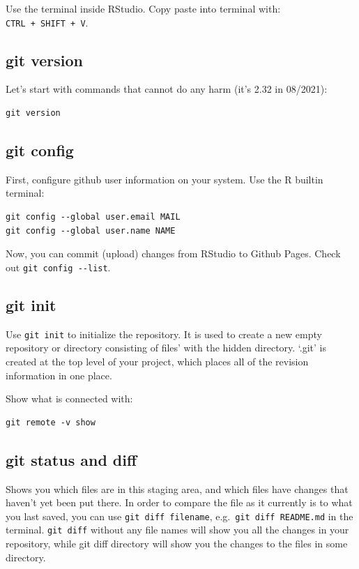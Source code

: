 \documentclass[
]{book}
\begin{document}
Use the terminal inside RStudio. Copy paste into terminal with: \texttt{CTRL\ +\ SHIFT\ +\ V}.

\hypertarget{git-version}{%
\subsection{git version}\label{git-version}}

Let's start with commands that cannot do any harm (it's 2.32 in 08/2021):

\begin{verbatim}
git version
\end{verbatim}

\hypertarget{git-config}{%
\subsection{git config}\label{git-config}}

First, configure github user information on your system. Use the R builtin terminal:

\begin{verbatim}
git config --global user.email MAIL
git config --global user.name NAME
\end{verbatim}

Now, you can commit (upload) changes from RStudio to Github Pages. Check out \texttt{git\ config\ -\/-list}.

\hypertarget{git-init}{%
\subsection{git init}\label{git-init}}

Use \texttt{git\ init} to initialize the repository. It is used to create a new empty repository or directory consisting of files' with the hidden directory. `.git' is created at the top level of your project, which places all of the revision information in one place.

Show what is connected with:

\begin{verbatim}
git remote -v show
\end{verbatim}

\hypertarget{git-status-and-diff}{%
\subsection{git status and diff}\label{git-status-and-diff}}

Shows you which files are in this staging area, and which files have changes that haven't yet been put there. In order to compare the file as it currently is to what you last saved, you can use \texttt{git\ diff\ filename}, e.g.~\texttt{git\ diff\ README.md} in the terminal. \texttt{git\ diff} without any file names will show you all the changes in your repository, while git diff directory will show you the changes to the files in some directory.
\end{document}
